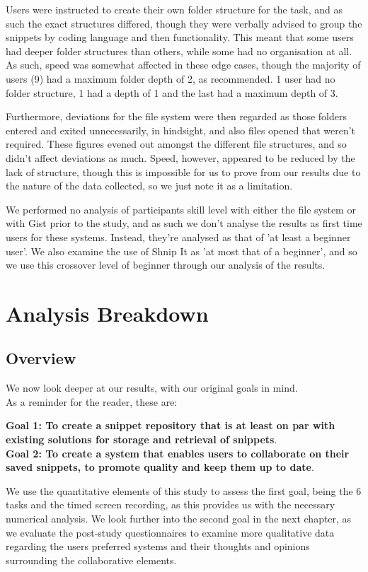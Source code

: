 Users were instructed to create their own folder structure for the task, and as such the exact structures differed, though they were verbally advised to group the snippets by coding language and then functionality. 
This meant that some users had deeper folder structures than others, while some had no organisation at all. 
As such, speed was somewhat affected in these edge cases, though the majority of users (9) had a maximum folder depth of 2, as recommended. 1 user had no folder structure, 1 had a depth of 1 and the last had a maximum depth of 3.

Furthermore, deviations for the file system were then regarded as those folders entered and exited unnecessarily, in hindsight, and also files opened that weren't required.
These figures evened out amongst the different file structures, and so didn't affect deviations as much.
Speed, however, appeared to be reduced by the lack of structure, though this is impossible for us to prove from our results due to the nature of the data collected, so we just note it as a limitation.

We performed no analysis of participants skill level with either the file system or with Gist prior to the study, and as such we don't analyse the results as first time users for these systems. 
Instead, they're analysed as that of 'at least a beginner user'.
We also examine the use of Shnip It as 'at most that of a beginner', and so we use this crossover level of beginner through our analysis of the results.

\section{Analysis Breakdown}
\subsection{Overview}
We now look deeper at our results, with our original goals in mind.\\
As a reminder for the reader, these are:

\textbf{Goal 1: To create a snippet repository that is at least on par with existing solutions for storage and retrieval of snippets}. \\
\textbf{Goal 2: To create a system that enables users to collaborate on their saved snippets, to promote quality and keep them up to date}.

We use the quantitative elements of this study to assess the first goal, being the 6 tasks and the timed screen recording, as this provides us with the necessary numerical analysis.
We look further into the second goal in the next chapter, as we evaluate the post-study questionnaires to examine more qualitative data regarding the users preferred systems and their thoughts and opinions surrounding the collaborative elements.

